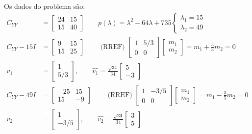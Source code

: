 \documentclass{article}
\begin{document}
Os dados do problema são:
\begin{align*}
    C_{YY} &= \begin{bmatrix} 24 & 15\\15 & 40 \end{bmatrix} \qquad p(\lambda) = \lambda^2 -64\lambda + 735
    \begin{cases}
        \lambda_1 = 15\\
        \lambda_2 = 49
    \end{cases}\\
    C_{YY} - 15I &= \begin{bmatrix} 9 & 15\\15 & 25 \end{bmatrix} \qquad \text{ (RREF) }
    \begin{bmatrix} 1 & 5/3\\0 & 0 \end{bmatrix} \begin{bmatrix} m_1\\m_2 \end{bmatrix} = m_1 +\frac{5}{3}m_2 = 0 \\
    v_1 &= \begin{bmatrix} 1 \\ 5/3 \end{bmatrix}, \qquad \widehat{v_1} = \frac{\sqrt{34}}{34} \begin{bmatrix} 5\\-3  \end{bmatrix} \\
    C_{YY} - 49I &= \begin{bmatrix} -25 & 15\\15 & -9 \end{bmatrix} \qquad \text{ (RREF) }
    \begin{bmatrix} 1 & -3/5\\0 & 0 \end{bmatrix} \begin{bmatrix} m_1\\m_2 \end{bmatrix} = m_1 -\frac{3}{5}m_2 = 0 \\
    v_2 &= \begin{bmatrix} 1 \\ -3/5 \end{bmatrix}, \qquad \widehat{v_2} = \frac{\sqrt{34}}{34} \begin{bmatrix} 3\\5  \end{bmatrix} \\
\end{align*}
\end{document}

